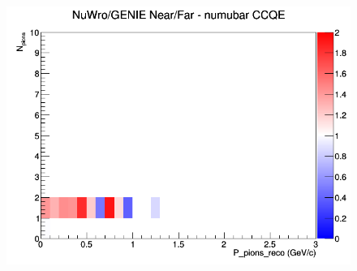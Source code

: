 \documentclass[12pt]{article}
\begin{document}
\begin{figure}[h]
\endminipage
{}
\includegraphics[width=\linewidth]{eff_N_P/LAr/pions/ratios/CCQE_NuWro_GENIE_numubar_NF_N_P.png}
\endminipage
\newline
\end{figure}
\clearpage
\end{document}
